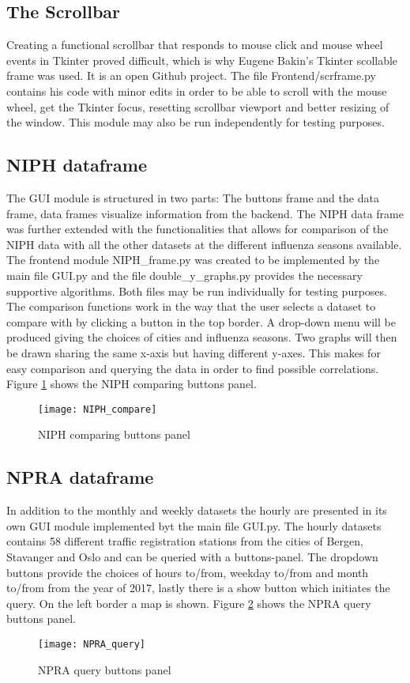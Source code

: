\subsection{The Scrollbar}
Creating a functional scrollbar that responds to mouse click and mouse wheel events in Tkinter proved difficult, which is why Eugene Bakin's Tkinter scollable\cite{scrframe} frame was used. It is an open Github project. The file Frontend/scrframe.py contains his code with minor edits in order to be able to scroll with the mouse wheel, get the Tkinter focus, resetting scrollbar viewport and better resizing of the window. This module may also be run independently for testing purposes.




\subsection{NIPH dataframe}
The GUI module is structured in two parts: The buttons frame and the data frame, data frames visualize information from the backend. The NIPH data frame was further extended with the functionalities that allows for comparison of the NIPH data with all the other datasets at the different influenza seasons available. The frontend module NIPH\_frame.py was created to be implemented by the main file GUI.py and the file double\_y\_graphs.py provides the necessary supportive algorithms. Both files may be run individually for testing purposes. The comparison functions work in the way that the user selects a dataset to compare with by clicking a button in the top border. A drop-down menu will be produced giving the choices of cities and influenza seasons. Two graphs will then be drawn sharing the same x-axis but having different y-axes. This makes for easy comparison and querying the data in order to find possible correlations. Figure \ref{fig:NIPH_compare} shows the NIPH comparing buttons panel.

\begin{figure}[ht]
\texttt{[image: NIPH\_compare]}
\centering
\caption{NIPH comparing buttons panel}
\label{fig:NIPH_compare}
\end{figure}

\subsection{NPRA dataframe}
In addition to the monthly and weekly datasets the hourly are presented in its own GUI module implemented byt the main file GUI.py. The hourly datasets contains 58 different traffic registration stations from the cities of Bergen, Stavanger and Oslo and can be queried with a buttons-panel. The dropdown buttons provide the choices of hours to/from, weekday to/from and month to/from from the year of 2017, lastly there is a show button which initiates the query. On the left border a map is shown.
Figure \ref{fig:NPRA_query} shows the NPRA query buttons panel.

\begin{figure}[ht]
\texttt{[image: NPRA\_query]}
\centering
\caption{NPRA query buttons panel}
\label{fig:NPRA_query}
\end{figure}




